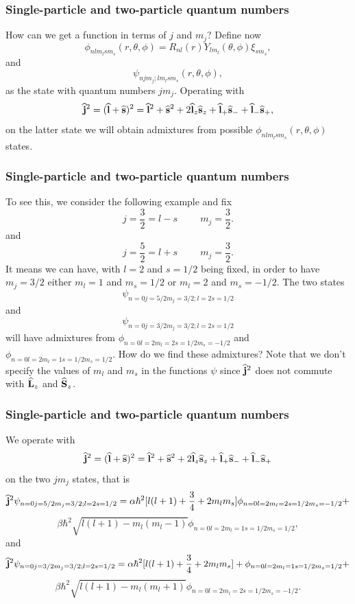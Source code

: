 \documentclass[compress]{beamer}
\newcommand{\OP}[1]{{\bf\widehat{#1}}}
\begin{document}
\frame
{
\frametitle{Single-particle and two-particle quantum numbers}

\begin{small}
{\scriptsize
How can we get a function in terms of $j$ and $m_j$?
Define now
\[
\phi_{nlm_lsm_s}(r,\theta,\phi)=R_{nl}(r)Y_{lm_l}(\theta,\phi)\xi_{sm_s},
\]
and 
\[
\psi_{njm_j;lm_lsm_s}(r,\theta,\phi),
\]
as the state with quantum numbers $jm_j$.
Operating with 
\[
   \OP{j}^2=(\OP{l}+\OP{s})^2=\OP{l}^2+\OP{s}^2+2\OP{l}_z\OP{s}_z+\OP{l}_+\OP{s}_{-}+\OP{l}_{-}\OP{s}_{+},
\]
on the latter state we will obtain admixtures from possible $\phi_{nlm_lsm_s}(r,\theta,\phi)$ states.
}
\end{small}
}


\frame
{
\frametitle{Single-particle and two-particle quantum numbers}

\begin{small}
{\scriptsize
To see this, we consider the following example and fix
\[
j=\frac{3}{2}=l-s\hspace{1cm} m_j=\frac{3}{2}.
\]
and
\[
j=\frac{5}{2}=l+s\hspace{1cm} m_j=\frac{3}{2}.
\]
It means we can have, with $l=2$ and $s=1/2$ being fixed, in order to have $m_j=3/2$ either $m_l=1$ and $m_s=1/2$ or
$m_l=2$ and $m_s=-1/2$. The two states    
\[
\psi_{n=0j=5/2m_j=3/2;l=2s=1/2}
\]
and
\[
\psi_{n=0j=3/2m_j=3/2;l=2s=1/2}
\]
will have admixtures from $\phi_{n=0l=2m_l=2s=1/2m_s=-1/2}$ and $\phi_{n=0l=2m_l=1s=1/2m_s=1/2}$. 
How do we find these admixtures? Note that we don't specify the values of $m_l$ and $m_s$ 
in the functions $\psi$ since    
$\OP{j}^2$ does not commute with $\OP{L}_z$ and $\OP{S}_z$. 
}
\end{small}
}


\frame
{
\frametitle{Single-particle and two-particle quantum numbers}

\begin{small}
{\scriptsize
We operate with 
\[
   \OP{j}^2=(\OP{l}+\OP{s})^2=\OP{l}^2+\OP{s}^2+2\OP{l}_z\OP{s}_z+\OP{l}_+\OP{s}_{-}+\OP{l}_{-}\OP{s}_{+}
\]
on the two $jm_j$ states, that is
\[
\OP{j}^2\psi_{n=0j=5/2m_j=3/2;l=2s=1/2}= \alpha\hbar^2[l(l+1)+\frac{3}{4}+2m_lm_s]\phi_{n=0l=2m_l=2s=1/2m_s=-1/2}+
\]
\[
\beta\hbar^2\sqrt{l(l+1)-m_l(m_l-1)}\phi_{n=0l=2m_l=1s=1/2m_s=1/2},
\]
and 
\[
\OP{j}^2\psi_{n=0j=3/2m_j=3/2;l=2s=1/2}= \alpha\hbar^2[l(l+1)+\frac{3}{4}+2m_lm_s]+ \phi_{n=0l=2m_l=1s=1/2m_s=1/2}+
\]
\[
\beta\hbar^2\sqrt{l(l+1)-m_l(m_l+1)}\phi_{n=0l=2m_l=2s=1/2m_s=-1/2}.
\]
}
\end{small}
}
\end{document}
